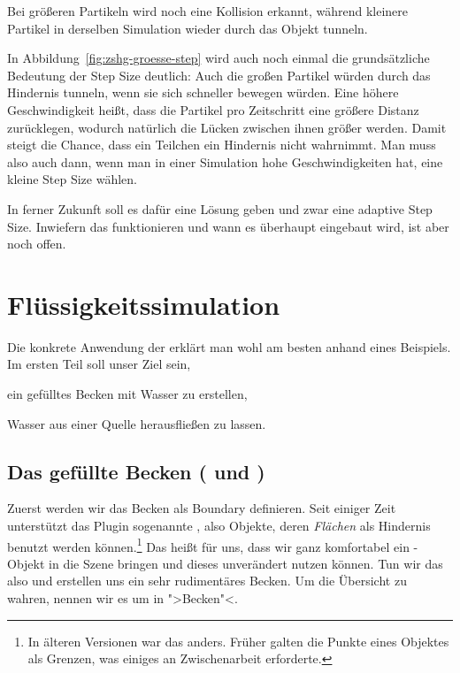 \documentclass[10pt,DIV=14,a4paper]{scrartcl}
\begin{document}
{Bei größeren Partikeln wird noch eine Kollision erkannt, während
kleinere Partikel in derselben Simulation wieder durch das Objekt
tunneln.}

In Abbildung~\ref{fig:zshg-groesse-step} wird auch noch einmal die
grundsätzliche Bedeutung der Step Size deutlich: Auch die großen
Partikel würden durch das Hindernis tunneln, wenn sie sich schneller
bewegen würden. Eine höhere Geschwindigkeit heißt, dass die Partikel pro
Zeitschritt eine größere Distanz zurücklegen, wodurch natürlich die
Lücken zwischen ihnen größer werden. Damit steigt die Chance, dass ein
Teilchen ein Hindernis nicht wahrnimmt. Man muss also auch dann, wenn
man in einer Simulation hohe Geschwindigkeiten hat, eine kleine Step
Size wählen.

In ferner Zukunft soll es dafür eine Lösung geben und zwar eine adaptive
Step Size. Inwiefern das funktionieren und wann es überhaupt eingebaut
wird, ist aber noch offen.



\pagebreak
\section{Flüssigkeitssimulation}

Die konkrete Anwendung der \fluidsim erklärt man wohl am besten anhand
eines Beispiels. Im ersten Teil soll unser Ziel sein,
\enumA
	\item ein gefülltes Becken mit Wasser zu erstellen,
	\item Wasser aus einer Quelle herausfließen zu lassen.
\enumE

\subsection{Das gefüllte Becken ( und )}
Zuerst werden wir das Becken als Boundary definieren. Seit einiger Zeit
unterstützt das Plugin sogenannte , also Objekte,
deren \emph{Flächen} als Hindernis benutzt werden können.\footnote{In
älteren Versionen war das anders. Früher galten die Punkte eines
Objektes als Grenzen, was einiges an Zwischenarbeit erforderte.} Das
heißt für uns, dass wir ganz komfortabel ein \PolyMesh-Objekt in die
Szene bringen und dieses unverändert nutzen können. Tun wir das also und
erstellen uns ein sehr rudimentäres Becken. Um die Übersicht zu wahren,
nennen wir es um in ">Becken"<.
\end{document}
